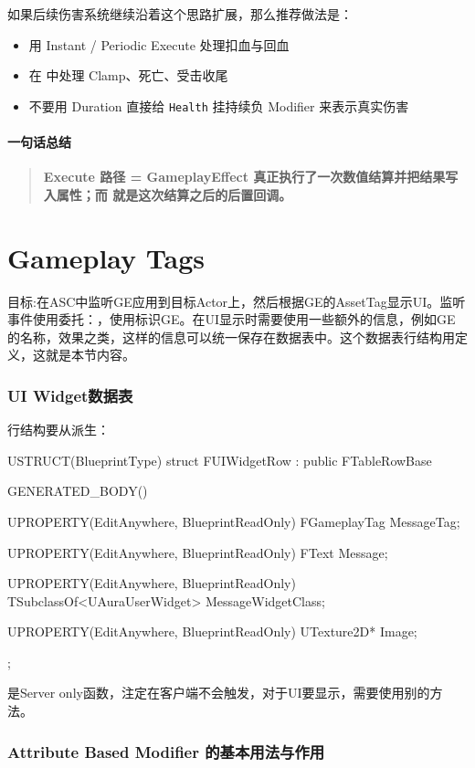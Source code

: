 \documentclass[10pt,CJKmath]{ctexart}
\begin{document}
如果后续伤害系统继续沿着这个思路扩展，那么推荐做法是：

\begin{itemize}
	\item 用 Instant / Periodic Execute 处理扣血与回血
	\item 在  中处理 Clamp、死亡、受击收尾
	\item 不要用 Duration 直接给 \verb|Health| 挂持续负 Modifier 来表示真实伤害
\end{itemize}

\subsection{一句话总结}

\begin{quote}
	\textbf{Execute 路径 = GameplayEffect 真正执行了一次数值结算并把结果写入属性；而  就是这次结算之后的后置回调。}
\end{quote}
\part{Gameplay Tags}
目标:在ASC中监听GE应用到目标Actor上，然后根据GE的AssetTag显示UI。监听事件使用委托：，使用标识GE。在UI显示时需要使用一些额外的信息，例如GE的名称，效果之类，这样的信息可以统一保存在数据表中。这个数据表行结构用\cppsign{}定义，这就是本节内容。
\section{UI Widget数据表}
行结构要从派生：
\begin{code}[caption={数据表}]
USTRUCT(BlueprintType)
struct FUIWidgetRow : public FTableRowBase
{
	GENERATED_BODY()
	
	UPROPERTY(EditAnywhere, BlueprintReadOnly)
	FGameplayTag MessageTag;
	
	UPROPERTY(EditAnywhere, BlueprintReadOnly)
	FText Message;
	
	UPROPERTY(EditAnywhere, BlueprintReadOnly)
	TSubclassOf<UAuraUserWidget> MessageWidgetClass;
	
	UPROPERTY(EditAnywhere, BlueprintReadOnly)
	UTexture2D* Image;
};
\end{code}
是Server only函数，注定在客户端不会触发，对于UI要显示，需要使用别的方法。

\section{Attribute Based Modifier 的基本用法与作用}
\end{document}
